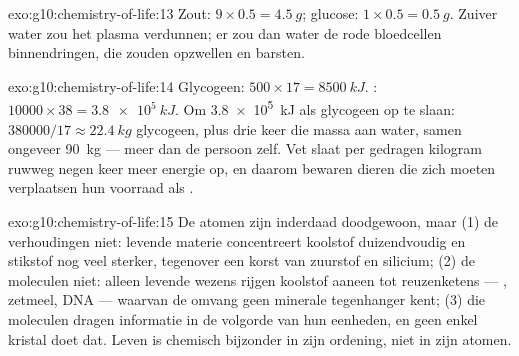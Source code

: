 \begin{solution}{exo:g10:chemistry-of-life:13}
Zout: $9 \times 0.5 = \qty{4.5}{g}$; glucose: $1 \times 0.5 =
\qty{0.5}{g}$. Zuiver water zou het plasma verdunnen; er zou dan water
de rode bloedcellen binnendringen, die zouden opzwellen en barsten.
\end{solution}

\begin{solution}{exo:g10:chemistry-of-life:14}
Glycogeen: $500 \times 17 = \qty{8500}{kJ}$. : $10000 \times 38 =
\qty{3.8e5}{kJ}$. Om \qty{3.8e5}{kJ} als glycogeen op te slaan: $380000/17
\approx \qty{22.4}{kg}$ glycogeen, plus drie keer die massa aan water,
samen ongeveer \qty{90}{kg} --- meer dan de persoon zelf. Vet
slaat per gedragen kilogram ruwweg negen keer meer energie op, en daarom
bewaren dieren die zich moeten verplaatsen hun voorraad als .
\end{solution}

\begin{solution}{exo:g10:chemistry-of-life:15}
De atomen zijn inderdaad doodgewoon, maar (1) de verhoudingen niet:
levende materie concentreert koolstof duizendvoudig en stikstof nog veel
sterker, tegenover een korst van zuurstof en silicium; (2) de moleculen
niet: alleen levende wezens rijgen koolstof aaneen tot reuzenketens ---
, zetmeel, DNA --- waarvan de omvang geen minerale tegenhanger
kent; (3) die moleculen dragen informatie in de volgorde van hun
eenheden, en geen enkel kristal doet dat. Leven is chemisch bijzonder in
zijn ordening, niet in zijn atomen.
\end{solution}

